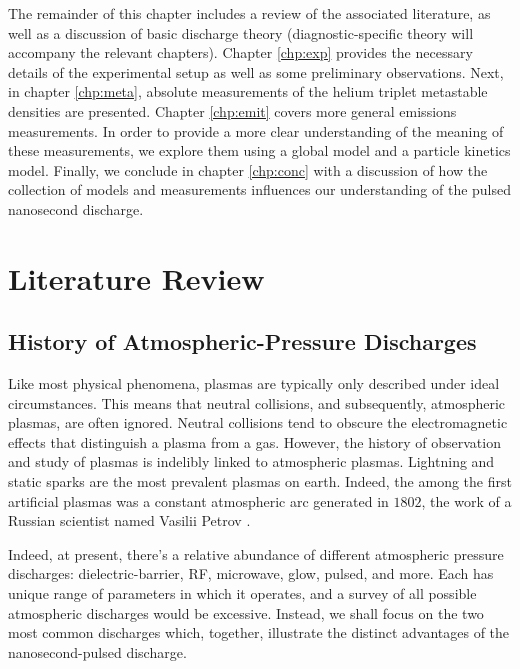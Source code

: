 The remainder of this chapter includes a review of the associated literature, as
well as a discussion of basic discharge theory (diagnostic-specific theory will
accompany the relevant chapters). Chapter \ref{chp:exp} provides the necessary
details of the experimental setup as well as some preliminary observations.
Next, in chapter \ref{chp:meta}, absolute measurements of the helium triplet
metastable densities are presented. Chapter \ref{chp:emit} covers more general
emissions measurements. In order to provide a more clear understanding of the
meaning of these measurements, we explore them using a global model and a
particle kinetics model. Finally, we conclude in chapter \ref{chp:conc} with a
discussion of how the collection of models and measurements influences our
understanding of the pulsed nanosecond discharge.

\section{Literature Review}

\subsection{History of Atmospheric-Pressure Discharges}


Like most physical phenomena, plasmas are typically only described under ideal
circumstances. This means that neutral collisions, and subsequently, atmospheric
plasmas, are often ignored. Neutral collisions tend to obscure the
electromagnetic effects that distinguish a plasma from a gas. However, the
history of observation and study of plasmas is indelibly linked to atmospheric
plasmas. Lightning and static sparks are the most prevalent plasmas on earth. 
Indeed, the among the first artificial plasmas was a constant atmospheric arc
generated in $1802$, the work of a Russian scientist named Vasilii Petrov
\cite{Anders2003}.

Indeed, at present, there's a relative abundance of different
atmospheric pressure discharges: dielectric-barrier, RF, microwave, glow,
pulsed, and more. Each has unique range of parameters in which it operates, and
a survey of all possible atmospheric discharges would be excessive. Instead, we
shall focus on the two most common discharges which, together, illustrate the
distinct advantages of the nanosecond-pulsed discharge.

